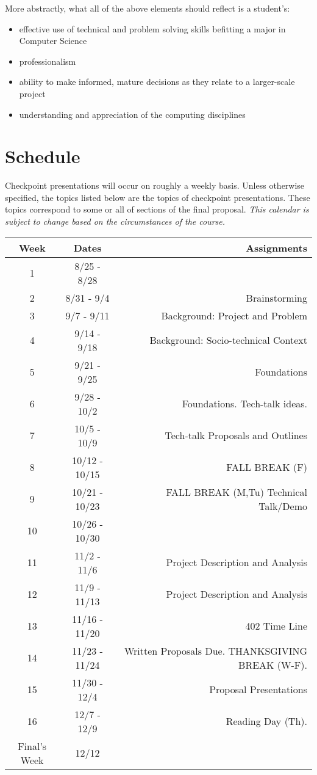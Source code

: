 \documentclass[10pt]{article}
\begin{document}
More abstractly, what all of the above elements should reflect is a student's: 
\begin{itemize}
\item effective use of technical and problem solving skills befitting a major in Computer Science
\item professionalism
\item ability to make informed, mature decisions as they relate to a larger-scale project
\item understanding and appreciation of the computing disciplines
\end{itemize}


\section{Schedule}

Checkpoint presentations will occur on roughly a weekly basis. Unless otherwise specified, the topics listed below are the topics of checkpoint presentations. These topics correspond to some or all of sections of the final proposal. \textit{This calendar is subject to change based on the circumstances of the course.}

\begin{center}
\begin{tabular}{|c|c|r|}
\hline 
Week & Dates & Assignments \\
\hline
1 & 8/25 - 8/28 &   \\
\hline 
2 & 8/31 - 9/4 &   Brainstorming \\
\hline
3 & 9/7 - 9/11 &   Background: Project and Problem \\
\hline
4 & 9/14 - 9/18 &  Background: Socio-technical Context \\
\hline
5 & 9/21 - 9/25 &  Foundations \\
\hline
6 & 9/28 - 10/2 &  Foundations. Tech-talk ideas. \\
\hline
7 & 10/5 - 10/9  & Tech-talk Proposals and Outlines\\
\hline 
8 & 10/12 - 10/15 &  FALL BREAK (F) \\
\hline
9 & 10/21 - 10/23 & FALL BREAK (M,Tu) Technical Talk/Demo \\
\hline
10 & 10/26 - 10/30 &  \\
\hline
11 & 11/2 - 11/6 & Project Description and Analysis \\
\hline
12 & 11/9 - 11/13 & Project Description and Analysis \\
\hline
13 & 11/16 - 11/20 & 402 Time Line \\ 
\hline
14 & 11/23 - 11/24 &  Written Proposals Due. THANKSGIVING BREAK (W-F).   \\
\hline
15 & 11/30 - 12/4 & Proposal Presentations\\ 
\hline
16 & 12/7 - 12/9 &   Reading Day (Th). \\
\hline
Final's Week & 12/12  \\ 
\hline
\end{tabular}
\end{center}
\end{document}
